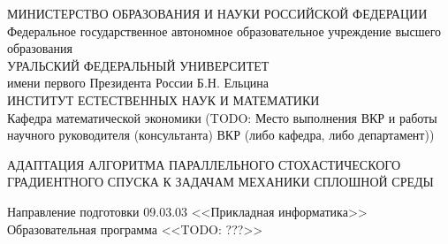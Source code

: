 \documentclass[12pt]{report}
\begin{document}
\pagestyle{empty} %
\begin{center}
\small
МИНИСТЕРСТВО ОБРАЗОВАНИЯ И НАУКИ РОССИЙСКОЙ ФЕДЕРАЦИИ\\
Федеральное государственное автономное образовательное учреждение высшего образования\\
УРАЛЬСКИЙ ФЕДЕРАЛЬНЫЙ УНИВЕРСИТЕТ \\
имени первого Президента России Б.Н. Ельцина\\
\vspace{1em}
ИНСТИТУТ ЕСТЕСТВЕННЫХ НАУК И МАТЕМАТИКИ\\
Кафедра математической экономики (TODO: Место выполнения ВКР и работы научного руководителя (консультанта) ВКР (либо кафедра, либо департамент))
\end{center}

\vspace{1em}

\begin{center}

\large
АДАПТАЦИЯ АЛГОРИТМА ПАРАЛЛЕЛЬНОГО СТОХАСТИЧЕСКОГО ГРАДИЕНТНОГО СПУСКА К ЗАДАЧАМ МЕХАНИКИ СПЛОШНОЙ СРЕДЫ
\vspace{1em}

\normalsize
Направление подготовки 09.03.03 <<Прикладная информатика>>\\
\vspace{1em}
Образовательная программа <<TODO: ???>>
\end{center}
\vspace{1em}
\end{document}
